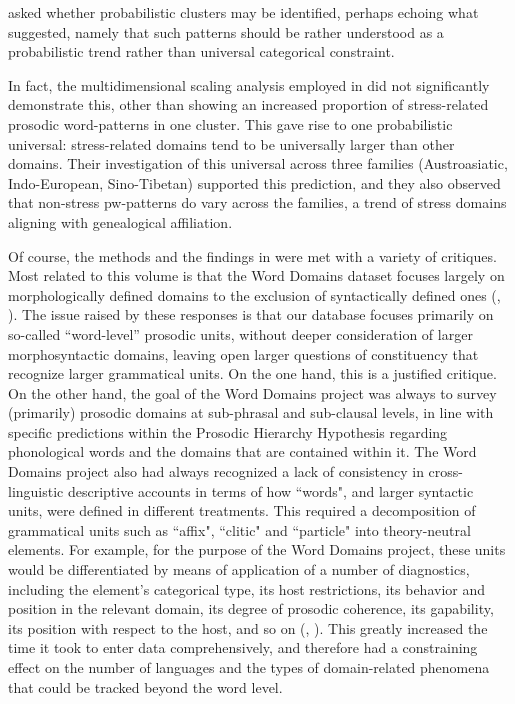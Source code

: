 \documentclass[output=paper]{langscibook}
\begin{document}
\citet{schieringetal:2010} asked whether probabilistic clusters may be identified, perhaps echoing what \citet{hyman_luganda_1987} suggested, namely that such patterns should be rather understood as a probabilistic trend rather than universal categorical constraint.


\hspace*{-3pt}In fact, the multidimensional scaling analysis employed in \citet{schieringetal:2010} did not significantly demonstrate this, other than showing an increased proportion of stress-related prosodic word-patterns in one cluster. This gave rise to one probabilistic universal: stress-related domains tend to be universally larger than other domains. Their investigation of this universal across three families (Austroasiatic, Indo-European, Sino-Tibetan) supported this prediction, and they also observed that non-stress pw-patterns do vary across the families, a trend of stress domains aligning with genealogical affiliation.

Of course, the methods and the findings in \citet{schieringetal:2010} were met with a variety of critiques. Most related to this volume is that the Word Domains dataset focuses largely on morphologically defined domains to the exclusion of syntactically defined ones (\citealt{bennett2019syntax}, \citealt{miller2018phonology}). The issue raised by these responses is that our database focuses primarily on so-called “word-level” prosodic units, without deeper consideration of larger morphosyntactic domains, leaving open larger questions of constituency that recognize larger grammatical units. On the one hand, this is a justified critique. On the other hand, the goal of the Word Domains project was always to survey (primarily) prosodic domains at sub-phrasal and sub-clausal levels, in line with specific predictions within the Prosodic Hierarchy Hypothesis regarding phonological words and the domains that are contained within it. The Word Domains project also had always recognized a lack of consistency in cross-linguistic descriptive accounts in terms of how ``words", and larger syntactic units, were defined in different treatments. This required a decomposition of grammatical units such as ``affix", ``clitic" and ``particle" into theory-neutral elements. For example, for the purpose of the Word Domains project, these units would be differentiated by means of application of a number of diagnostics, including the element’s categorical type, its host restrictions, its behavior and position in the relevant domain, its degree of prosodic coherence, its gapability, its position with respect to the host, and so on (\citealt{bickel_diversity_2005}, \citealt{Bickel2017}). This greatly increased the time it took to enter data comprehensively, and therefore had a constraining effect on the number of languages and the types of domain-related phenomena that could be tracked beyond the word level.
\end{document}
